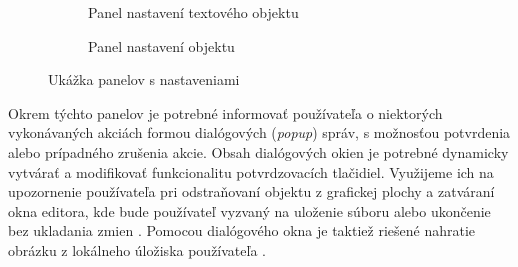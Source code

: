 \begin{figure}[H]
\begin{subfigure}[t]{0.48\linewidth}
		\caption{Panel nastavení textového objektu}
	\end{subfigure}
	\quad
	\begin{subfigure}[t]{0.48\linewidth}	
		\caption{Panel nastavení objektu}
	\end{subfigure}
	\caption{Ukážka panelov s nastaveniami}
\end{figure}
	


Okrem týchto panelov je potrebné informovať používateľa o niektorých vykonávaných akciách formou dialógových (\textit{popup}) správ, s možnosťou potvrdenia alebo prípadného zrušenia akcie. Obsah dialógových okien je potrebné dynamicky vytvárať a modifikovať funkcionalitu potvrdzovacích tlačidiel. Využijeme ich na upozornenie používateľa pri odstraňovaní objektu z grafickej plochy  a zatváraní okna editora, kde bude používateľ vyzvaný na uloženie súboru alebo ukončenie bez ukladania zmien . Pomocou dialógového okna je taktiež riešené nahratie obrázku z lokálneho úložiska používateľa .

